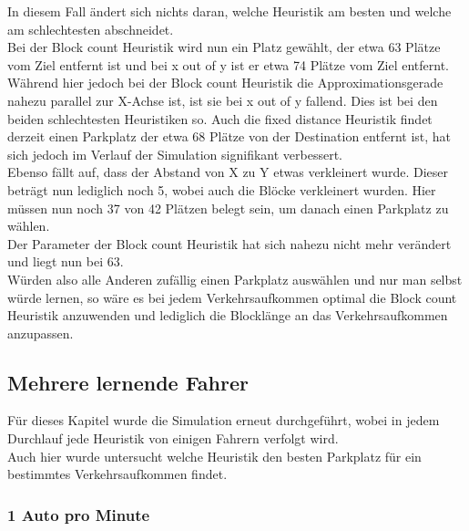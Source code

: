 In diesem Fall ändert sich nichts daran, welche Heuristik am besten und welche am schlechtesten abschneidet.\\
Bei der Block count Heuristik wird nun ein Platz gewählt, der etwa 63 Plätze vom Ziel entfernt ist und bei x out of y ist er etwa 74 Plätze vom Ziel entfernt. \\
Während hier jedoch bei der Block count Heuristik die Approximationsgerade nahezu parallel zur X-Achse ist, ist sie bei x out of y fallend. Dies ist bei den beiden schlechtesten Heuristiken so. Auch die fixed distance Heuristik findet derzeit einen Parkplatz der etwa 68 Plätze von der Destination entfernt ist, hat sich jedoch im Verlauf der Simulation signifikant verbessert.\\
Ebenso fällt auf, dass der Abstand von X zu Y etwas verkleinert wurde. Dieser beträgt nun lediglich noch 5, wobei auch die Blöcke verkleinert wurden. Hier müssen nun noch 37 von 42 Plätzen belegt sein, um danach einen Parkplatz zu wählen.\\
Der Parameter der Block count Heuristik hat sich nahezu nicht mehr verändert und liegt nun bei 63.\\

Würden also alle Anderen zufällig einen Parkplatz auswählen und nur man selbst würde lernen, so wäre es bei jedem Verkehrsaufkommen optimal die Block count Heuristik anzuwenden und lediglich die Blocklänge an das Verkehrsaufkommen anzupassen. 

\subsection{Mehrere lernende Fahrer}

Für dieses Kapitel wurde die Simulation erneut durchgeführt, wobei in jedem Durchlauf jede Heuristik von einigen Fahrern verfolgt wird. \\
Auch hier wurde untersucht welche Heuristik den besten Parkplatz für ein bestimmtes Verkehrsaufkommen findet.

\subsubsection{1 Auto pro Minute}

